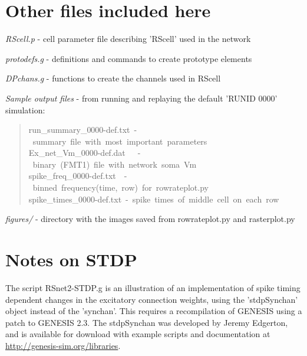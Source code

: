 \documentclass[10pt,a4paper,english]{article}
\begin{document}

\hypertarget{other-files-included-here}{}
\section*{Other files included here}
\label{other-files-included-here}

\emph{RScell.p} - cell parameter file describing 'RScell' used in the network

\emph{protodefs.g} - definitions and commands to create prototype elements

\emph{DPchans.g} - functions to create the channels used in RScell

\emph{Sample output files} - from running and replaying the default 'RUNID 0000'
simulation:
\begin{quote}{\ttfamily \raggedright \noindent
run{\_}summary{\_}0000-def.txt~-~summary~file~with~most~important~parameters~\\
Ex{\_}net{\_}Vm{\_}0000-def.dat~~~-~binary~(FMT1)~file~with~network~soma~Vm~\\
spike{\_}freq{\_}0000-def.txt~~-~binned~frequency(time,~row)~for~rowrateplot.py~\\
spike{\_}times{\_}0000-def.txt~-~spike~times~of~middle~cell~on~each~row
}\end{quote}

\emph{figures/} - directory with the images saved from rowrateplot.py and
rasterplot.py



\hypertarget{notes-on-stdp}{}
\section*{Notes on STDP}
\label{notes-on-stdp}

The script RSnet2-STDP.g is an illustration of an implementation of
spike timing dependent changes in the excitatory connection weights,
using the 'stdpSynchan' object instead of the 'synchan'. This requires
a recompilation of GENESIS using a patch to GENESIS 2.3.  The stdpSynchan
was developed by Jeremy Edgerton, and is available for download with
example scripts and documentation at \href{http://genesis-sim.org/libraries}{http://genesis-sim.org/libraries}.
\end{document}
